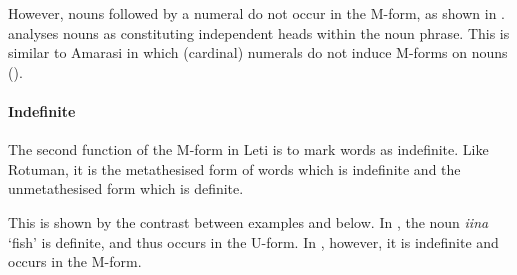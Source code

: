 \begin{exe}
\let\eachwordone=\it
\end{exe}

However, nouns followed by a numeral do not occur in the M-form, as shown in .
\citet[176]{en04} analyses nouns as constituting independent heads within the noun phrase.
This is similar to Amarasi in which (cardinal)
numerals do not induce M-forms on nouns ().

	\begin{exe}\let\eachwordone=\it
			\label{LetAM4}
	\end{exe}

\paragraph{Indefinite}\label{sec:LetInd}
The second function of the M-form in Leti
is to mark words as indefinite.
Like Rotuman, it is the metathesised form of words which is indefinite
and the unmetathesised form which is definite.

This is shown by the contrast between examples  and  below.
In , the noun \emph{iina} `fish' is definite,
and thus occurs in the U-form.
In , however, it is indefinite and occurs in the M-form.

